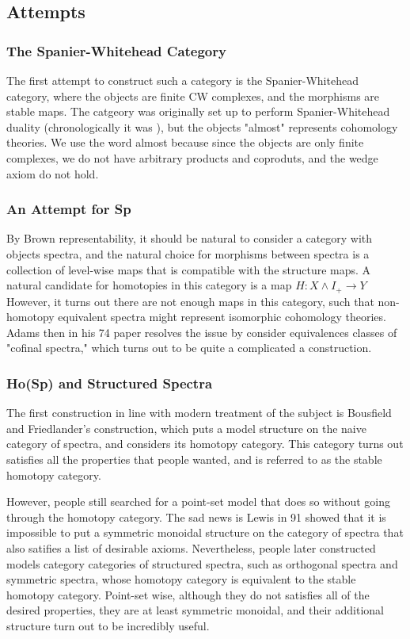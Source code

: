 \documentclass{article}
\theoremstyle{definition}
\theoremstyle{definition}
\theoremstyle{definition}
\theoremstyle{definition}
\theoremstyle{definition}
\theoremstyle{definition}
\theoremstyle{definition}
\begin{document}
\subsection{Attempts}

\subsubsection{The Spanier-Whitehead Category}
The first attempt to construct such a category is the Spanier-Whitehead category, where the objects are finite CW complexes, and the morphisms are stable maps. The catgeory was originally set up to perform Spanier-Whitehead duality (chronologically it was ), but the objects "almost" represents cohomology theories. We use the word almost because since the objects are only finite complexes, we do not have arbitrary products and coproduts, and the wedge axiom do not hold. 
\subsubsection{An Attempt for \textrm{Sp}}
By Brown representability, it should be natural to consider a category with objects spectra, and the natural choice for morphisms between spectra is a collection of level-wise maps that is compatible with the structure maps. A natural candidate for homotopies in this category is a map $H: X\wedge I_{+}\to Y$ However, it turns out there are not enough maps in this category, such that non-homotopy equivalent spectra might represent isomorphic cohomology theories. Adams then in his 74 paper resolves the issue by consider equivalences classes of "cofinal spectra," which turns out to be quite a complicated a construction. 

\subsubsection{\textrm{Ho(Sp)} and Structured Spectra}
The first construction in line with modern treatment of the subject is Bousfield and Friedlander's construction, which puts a model structure on the naive category of spectra, and considers its homotopy category. This category turns out satisfies all the properties that people wanted, and is referred to as the stable homotopy category.

However, people still searched for a point-set model that does so without going through the homotopy category. The sad news is Lewis in 91 showed that it is impossible to put a symmetric monoidal structure on the category of spectra that also satifies a list of desirable axioms. Nevertheless, people later constructed models category categories of structured spectra, such as orthogonal spectra and symmetric spectra, whose homotopy category is equivalent to the stable homotopy category. Point-set wise, although they do not satisfies all of the desired properties, they are at least symmetric monoidal, and their additional structure turn out to be incredibly useful.
\end{document}
